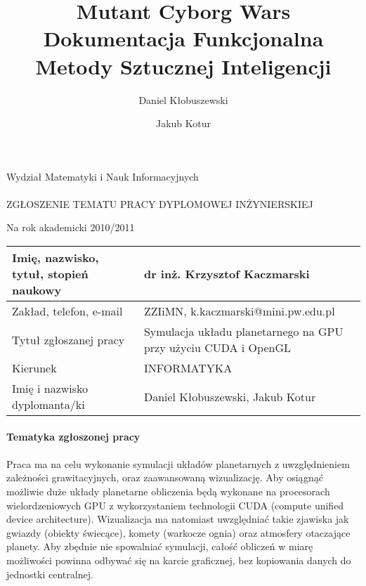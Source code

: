 \documentclass[a4paper,titlepage,10pt]{article}
\title{\huge Mutant Cyborg Wars \\\large Dokumentacja Funkcjonalna\\\small Metody Sztucznej Inteligencji }
\author{Daniel Kłobuszewski\and Jakub Kotur}
\begin{document}
	\paragraph{}

	Wydział Matematyki i Nauk Informacyjnych

	\paragraph{}
	\begin{center}
	ZGŁOSZENIE TEMATU PRACY DYPLOMOWEJ INŻYNIERSKIEJ

	Na rok akademicki 2010/2011
	\end{center}

	\begin{tabular}{ | l | p{} | }
	\hline
	Imię, nazwisko, tytuł, stopień naukowy & dr inż. Krzysztof Kaczmarski \\ \hline
	Zakład, telefon, e-mail & ZZIiMN, k.kaczmarski@mini.pw.edu.pl \\\hline
	Tytuł zgłoszanej pracy & Symulacja układu planetarnego na GPU przy użyciu CUDA i OpenGL \\\hline
	Kierunek & INFORMATYKA \\\hline
	Imię i nazwisko dyplomanta/ki & Daniel Kłobuszewski, Jakub Kotur \\\hline
	\end{tabular}

	\paragraph{Tematyka zgłoszonej pracy}

	\paragraph{}
	
	Praca ma na celu wykonanie symulacji układów planetarnych z uwzględnieniem zależności grawitacyjnych, oraz zaawansowaną wizualizację. Aby osiągnąć możliwie duże układy planetarne obliczenia będą wykonane na procesorach wielordzeniowych GPU z wykorzystaniem technologii CUDA (compute unified device architecture). Wizualizacja ma natomiast uwzględniać takie zjawiska jak gwiazdy (obiekty świecące), komety (warkocze ognia) oraz atmosfery otaczające planety. Aby zbędnie nie spowalniać symulacji, całość obliczeń w miarę możliwości powinna odbywać się na karcie graficznej, bez kopiowania danych do jednostki centralnej.
\end{document}
